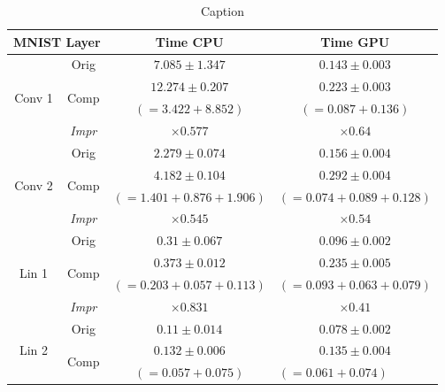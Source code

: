 \begin{table}
\centering
\small
\caption{Caption}
\label{tab:res_MNIST_time}
\begin{tabular}{cc|cc}
\multicolumn{2}{c}{\textbf{MNIST Layer}}        & Time CPU               & Time GPU                             \\ \hline
\multirow{4}{*}{Conv 1} & Orig                  & $7.085\pm 1.347$       & $0.143\pm 0.003$                     \\
                        & \multirow{2}{*}{Comp} & $12.274\pm 0.207$      & $0.223\pm 0.003$                     \\
                        &                       & $(=3.422+8.852)$       & $(=0.087+0.136)$                     \\
                        & \textit{Impr}         & $ \times 0.577$        & $ \times 0.64$                       \\ \hline
\multirow{4}{*}{Conv 2} & Orig                  & $2.279\pm 0.074$       & $0.156\pm 0.004$                     \\
                        & \multirow{2}{*}{Comp} & $4.182\pm 0.104$       & $0.292\pm 0.004$                     \\
                        &                       & $(=1.401+0.876+1.906)$ & $(=0.074+0.089+0.128)$               \\
                        & \textit{Impr}         & $ \times 0.545$        & $ \times 0.54$                       \\ \hline
\multirow{4}{*}{Lin 1}  & Orig                  & $0.31\pm 0.067$        & $0.096\pm 0.002$                     \\
                        & \multirow{2}{*}{Comp} & $0.373\pm 0.012$       & $0.235\pm 0.005$                     \\
                        &                       & $(=0.203+0.057+0.113)$ & $(=0.093+0.063+0.079)$               \\
                        & \textit{Impr}         & $ \times 0.831$        & $ \times 0.41$                       \\ \hline
\multirow{4}{*}{Lin 2}  & Orig                  & $0.11\pm 0.014$        & $0.078\pm 0.002$                     \\
                        & \multirow{2}{*}{Comp} & $0.132\pm 0.006$       & $0.135\pm 0.004$                     \\
                        &                       & $(=0.057+0.075)$       & \multicolumn{1}{l}{$(=0.061+0.074)$} \\

\end{tabular}
\end{table}
